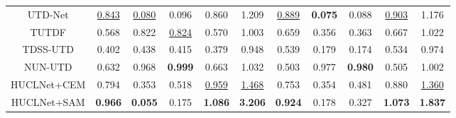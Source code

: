 \begin{table*}[!t]
{\begin{tabular}{ccccccccccc}
                                    UTD-Net     & \underline{0.843}          & \underline{0.080}    & 0.096          & 0.860          & 1.209          & \underline{0.889}          & \textbf{0.075} & 0.088          & \underline{0.903}          & 1.176          \\
                                    TUTDF       & 0.568          & 0.822          & \underline{0.824}    & 0.570          & 1.003          & 0.659          & 0.356          & 0.363          & 0.667          & 1.022          \\
                                    TDSS-UTD    & 0.402          & 0.438          & 0.415          & 0.379          & 0.948          & 0.539 & 0.179          & 0.174          & 0.534          & 0.974          \\
                                    NUN-UTD     & 0.632          & 0.968          & \textbf{0.999} & 0.663          & 1.032          & 0.503          & 0.977          & \textbf{0.980} & 0.505          & 1.002          \\
            \rowcolor{tablecolor13!60}HUCLNet+CEM & 0.794    & 0.353          & 0.518          & \underline{0.959}    & \underline{1.468}    & 0.753    & 0.354          & 0.481          & 0.880    & \underline{1.360}    \\
            \rowcolor{tablecolor14!60}HUCLNet+SAM & \textbf{0.966} & \textbf{0.055} & 0.175          & \textbf{1.086} & \textbf{3.206} & \textbf{0.924} & 0.178          & 0.327          & \textbf{1.073} & \textbf{1.837} \\ \hline
        \end{tabular}}
\end{table*}
